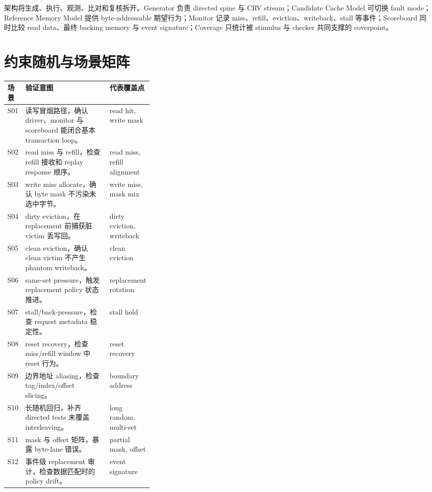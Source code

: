 \documentclass[UTF8,fontset=windows,zihao=-4]{ctexart}
\newcommand{\tightsection}[1]{\section{#1}\vspace{-0.2em}}
\begin{document}
架构将生成、执行、观测、比对和复核拆开。Generator 负责 directed spine 与 CRV stream；Candidate Cache Model 可切换 fault mode；Reference Memory Model 提供 byte-addressable 期望行为；Monitor 记录 miss、refill、eviction、writeback、stall 等事件；Scoreboard 同时比较 read data、最终 backing memory 与 event signature；Coverage 只统计被 stimulus 与 checker 共同支撑的 coverpoint。

\tightsection{约束随机与场景矩阵}
\begin{tabularx}{\linewidth}{P{0.11\linewidth}YP{0.23\linewidth}}
\toprule
场景 & 验证意图 & 代表覆盖点 \\
\midrule
S01 & 读写冒烟路径，确认 driver、monitor 与 scoreboard 能闭合基本 transaction loop。 & read hit, write mask \\
S02 & read miss 与 refill，检查 refill 接收和 replay response 顺序。 & read miss, refill alignment \\
S03 & write miss allocate，确认 byte mask 不污染未选中字节。 & write miss, mask mix \\
S04 & dirty eviction，在 replacement 前捕获脏 victim 丢写回。 & dirty eviction, writeback \\
S05 & clean eviction，确认 clean victim 不产生 phantom writeback。 & clean eviction \\
S06 & same-set pressure，触发 replacement policy 状态推进。 & replacement rotation \\
S07 & stall/back-pressure，检查 request metadata 稳定性。 & stall hold \\
S08 & reset recovery，检查 miss/refill window 中 reset 行为。 & reset recovery \\
S09 & 边界地址 aliasing，检查 tag/index/offset slicing。 & boundary address \\
S10 & 长随机回归，补齐 directed tests 未覆盖 interleaving。 & long random, multi-set \\
S11 & mask 与 offset 矩阵，暴露 byte-lane 错误。 & partial mask, offset \\
S12 & 事件级 replacement 审计，检查数据匹配时的 policy drift。 & event signature \\
\bottomrule
\end{tabularx}
\end{document}
